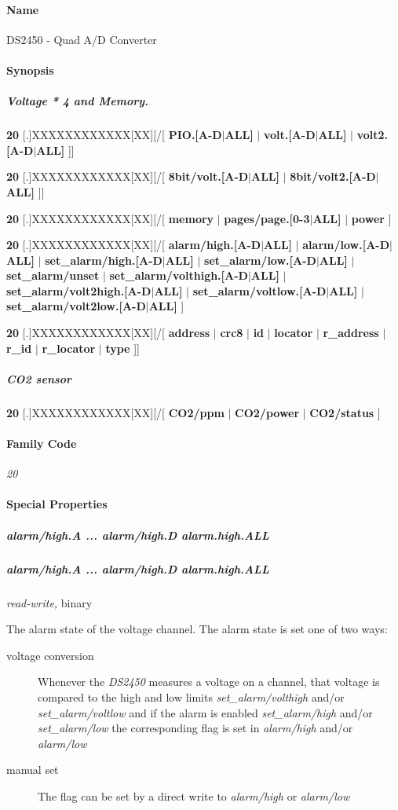 \paragraph*{Name}
DS2450 - Quad A/D Converter 
\paragraph*{Synopsis}

\subparagraph*{Voltage * 4  and Memory.}

\textbf{20}
[.]XXXXXXXXXXXX[XX][/[ \textbf{PIO.[A-D$|$ALL]} $|$ \textbf{volt.[A-D$|$ALL]} $|$ \textbf{volt2.[A-D$|$ALL]} ]] 

\textbf{20} [.]XXXXXXXXXXXX[XX][/[
\textbf{8bit/volt.[A-D$|$ALL]} $|$ \textbf{8bit/volt2.[A-D$|$ALL]} ]] 

\textbf{20} [.]XXXXXXXXXXXX[XX][/[ \textbf{memory}
$|$ \textbf{pages/page.[0-3$|$ALL]} $|$ \textbf{power} ] 

\textbf{20} [.]XXXXXXXXXXXX[XX][/[ \textbf{alarm/high.[A-D$|$ALL]}
$|$ \textbf{alarm/low.[A-D$|$ALL]} $|$ \textbf{set\_alarm/high.[A-D$|$ALL]} $|$ \textbf{set\_alarm/low.[A-D$|$ALL]} $|$ \textbf{set\_alarm/unset}
$|$ \textbf{set\_alarm/volthigh.[A-D$|$ALL]} $|$ \textbf{set\_alarm/volt2high.[A-D$|$ALL]} $|$ \textbf{set\_alarm/voltlow.[A-D$|$ALL]}
$|$ \textbf{set\_alarm/volt2low.[A-D$|$ALL]} ] 

\textbf{20} [.]XXXXXXXXXXXX[XX][/[           \textbf{address}
$|$ \textbf{crc8} $|$ \textbf{id} $|$ \textbf{locator} $|$ \textbf{r\_address} $|$ \textbf{r\_id} $|$ \textbf{r\_locator} $|$ \textbf{type}  ]] 
\subparagraph*{CO2 sensor}

\textbf{20} [.]XXXXXXXXXXXX[XX][/[
\textbf{CO2/ppm} $|$ \textbf{CO2/power} $|$ \textbf{CO2/status} ] 
\paragraph*{Family Code}


\textit{20} 
\paragraph*{Special Properties}

\subparagraph*{alarm/high.A
... alarm/high.D alarm.high.ALL}
\subparagraph*{alarm/high.A ... alarm/high.D alarm.high.ALL}\textit{read-write,}
binary 

The alarm state of the voltage channel. The alarm state is set one of two
ways: \begin{description}
\item [voltage conversion ] Whenever the \textit{DS2450} measures a voltage on a channel,
that voltage is compared to the high and low limits \textit{set\_alarm/volthigh}
and/or \textit{set\_alarm/voltlow} and if the alarm is enabled \textit{set\_alarm/high} and/or
\textit{set\_alarm/low} the corresponding flag is set in \textit{alarm/high} and/or \textit{alarm/low}

\item [manual set ] The flag can be set by a direct write to \textit{alarm/high} or \textit{alarm/low}

\end{description}

